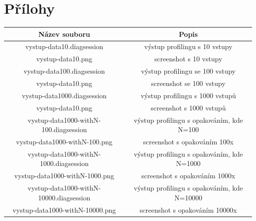 \documentclass{article}
\begin{document}
\section{Přílohy}
\begin{tabular}[pos]{ | c | c |}
\hline
{\bf Název souboru} & {\bf Popis} \\
\hline
vystup-data10.diagsession & výstup profilingu s 10 vstupy \\
vystup-data10.png & screenshot s 10 vstupy \\
\hline
vystup-data100.diagsession & výstup profilingu se 100 vstupy \\
vystup-data10.png & screenshot se 100 vstupy \\
\hline
vystup-data1000.diagsession & výstup profilingu s 1000 vstupů \\
vystup-data10.png & screenshot s 1000 vstupů \\
\hline
vystup-data1000-withN-100.diagsession & výstup profilingu s opakováním, kde N=100 \\
vystup-data1000-withN-100.png & screenshot s opakováním 100x \\
\hline
vystup-data1000-withN-1000.diagsession & výstup profilingu s opakováním, kde N=1000 \\
vystup-data1000-withN-1000.png & screenshot s opakováním 1000x \\
\hline
vystup-data1000-withN-10000.diagsession & výstup profilingu s opakováním, kde N=10000 \\
vystup-data1000-withN-10000.png & screenshot s opakováním 10000x \\
\hline
\end{tabular}
\end{document}
